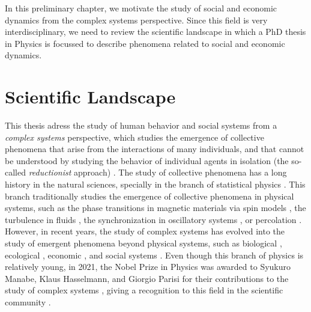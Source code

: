 \setcounter{page}{1}

In this preliminary chapter, we motivate the study of social and economic dynamics from the complex systems perspective. Since this field is very interdisciplinary, we need to review the scientific landscape in which a PhD thesis in Physics is focussed to describe phenomena related to social and economic dynamics.

\section{\label{sec:scie_lands} Scientific Landscape}

This thesis adress the study of human behavior and social systems from a \textit{complex systems} perspective, which studies the emergence of collective phenomena that arise from the interactions of many individuals, and that cannot be understood by studying the behavior of individual agents in isolation (the so-called \textit{reductionist} approach) \cite{anderson1972more}. The study of collective phenomena has a long history in the natural sciences, specially in the branch of statistical physics \cite{stanley1971phase}. This branch traditionally studies the emergence of collective phenomena in physical systems, such as the phase transitions in magnetic materials via spin models \cite{onsager-1944}, the turbulence in fluids \cite{frisch1995turbulence}, the synchronization in oscillatory systems \cite{pikovsky2001universal}, or percolation \cite{stauffer-1985}. However, in recent years, the study of complex systems has evolved into the study of emergent phenomena beyond physical systems, such as biological \cite{prigogine1977self}, ecological \cite{may-2001}, economic \cite{arthur-1994}, and social systems \cite{castellano-2009}. Even though this branch of physics is relatively young, in 2021, the Nobel Prize in Physics was awarded to Syukuro Manabe, Klaus Hasselmann, and Giorgio Parisi for their contributions to the study of complex systems \cite{nobel-2021}, giving a recognition to this field in the scientific community \cite{bianconi2023complex}.

